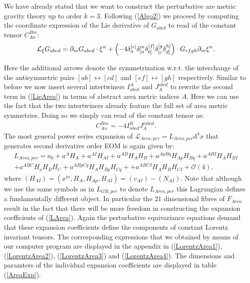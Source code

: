 \documentclass[a4paper,12pt, DIV=14, BCOR=5mm, twoside, headsepline]{scrbook}
\newcommand{\mathnode}[1]{%
   \mathord{\tikz[baseline=(#1.base), inner sep = 0pt]{\node (#1) {$\scriptstyle{#1}$};}}}
\begin{document}
We have already stated that we want to construct the perturbative are metric gravity theory up to order $k=3$. Following (\ref{Algo2}) we proceed by computing the coordinate expression of the Lie derivative of $G_{abcd}$ to read of the constant tensor $C_{An}^{Bm}$:
\begin{align}\label{LieArea}
    \mathcal{L}_{\xi} G_{abcd} = \partial_m G_{abcd} \cdot \xi^n + \left (-4 \delta_n^{[e\vert} \delta_{[\mathnode{a}}^m \delta_{b]}^{\vert \mathnode{f} ]} \delta_{[c}^{[g} \delta_{\mathnode{d}]}^{\mathnode{h}]} \right ) \cdot G_{efgh} \partial_m \xi^n.
\end{align}
Here the additional arrows denote the symmetrization w.r.t. the interchange of the antisymmetric pairs $[ab] \leftrightarrow [cd]$ and $[ef] \leftrightarrow [gh]$ respectively.
%
%
%
Similar to before we now insert several intertwiners $I^A_{abcd}$ and $J_A^{abcd}$ to rewrite the second term in (\ref{LieArea}) in terms of abstract area metric indices $A$. Here we can use the fact that the two intertwiners already feature the full set of area metric symmetries.  Doing so we simply can read of the constant tensor as:
\begin{align}\label{areaGotayMInter}
    C_{An}^{Bm} = -4 I^B_{nbcd} J_A^{mbcd}.
\end{align}
The most general power series expansion of $\mathcal{L}_{Area,per} = L_{Area,per}\mathrm{d}^4x$ that generates second derivative order EOM is again given by:
\begin{align}\label{LArea}
    L_{Area,per} =  a_0 + a^A H_A + a^{AI}H_{AI} + a^{AB} H_{A}H_{B} + a^{ApBq} H_{Ap}H_{Bq} + a^{ABI} H_{A} H_{BI} \\
    + a^{ABC} H_a H_B H_C + a^{ABpCq} H_{A}H_{Bp}H_{Cq} +
    + a^{ABCI} H_A H_B H_{CI} 
    + \mathcal{O}(4),
\end{align}
where $(H_{AI}) = (x^m,H_A,H_{Ap},H_{AI}) = (v_{AI}) - (N_{AI})$. Note that although we use the same symbols as in $L_{GR,per}$ to denote $L_{Area,per}$ this Lagrangian defines a fundamentally different object. In particular the $21$ dimensional fibres of  $F_{Area}$ result in the fact that there will be more freedom in constructing the expansion coefficients of (\ref{LArea}). Again the perturbative equivariance equations demand that these expansion coefficients define the components of constant Lorentz invariant tensors. The corresponding expressions that we obtained by means of our computer program are displayed in the appendix in (\ref{LorentzArea1}), (\ref{LorentzArea2}), (\ref{LorentzArea3}) and (\ref{LorentzArea4}). The dimensions and paramters of the individual expansion coefficients are displayed in table (\ref{AreaExp}).
\end{document}
